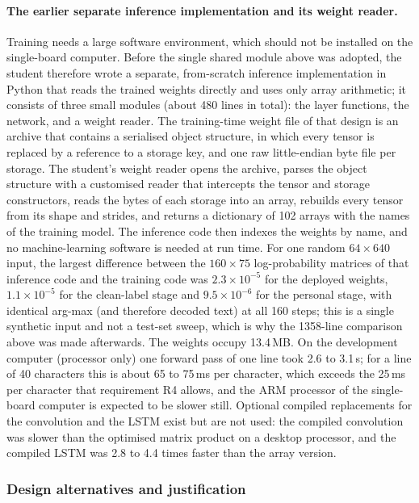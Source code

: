 \paragraph{The earlier separate inference implementation and its weight reader.}
Training needs a large software environment, which should not be installed on the single-board computer.
Before the single shared module above was adopted, the student therefore wrote a separate, from-scratch inference implementation in Python that reads the trained weights directly and uses only array arithmetic; it consists of three small modules (about 480 lines in total): the layer functions, the network, and a weight reader.
The training-time weight file of that design is an archive that contains a serialised object structure, in which every tensor is replaced by a reference to a storage key, and one raw little-endian byte file per storage.
The student's weight reader opens the archive, parses the object structure with a customised reader that intercepts the tensor and storage constructors, reads the bytes of each storage into an array, rebuilds every tensor from its shape and strides, and returns a dictionary of 102 arrays with the names of the training model.
The inference code then indexes the weights by name, and no machine-learning software is needed at run time.
For one random $64\times640$ input, the largest difference between the $160\times75$ log-probability matrices of that inference code and the training code was $2.3\times10^{-5}$ for the deployed weights, $1.1\times10^{-5}$ for the clean-label stage and $9.5\times10^{-6}$ for the personal stage, with identical arg-max (and therefore decoded text) at all 160 steps; this is a single synthetic input and not a test-set sweep, which is why the 1358-line comparison above was made afterwards.
The weights occupy 13.4\,MB.
On the development computer (processor only) one forward pass of one line took 2.6 to 3.1\,s; for a line of 40 characters this is about 65 to 75\,ms per character, which exceeds the 25\,ms per character that requirement R4 allows, and the ARM processor of the single-board computer is expected to be slower still.
Optional compiled replacements for the convolution and the LSTM exist but are not used: the compiled convolution was slower than the optimised matrix product on a desktop processor, and the compiled LSTM was 2.8 to 4.4 times faster than the array version.

\subsubsection{Design alternatives and justification}

